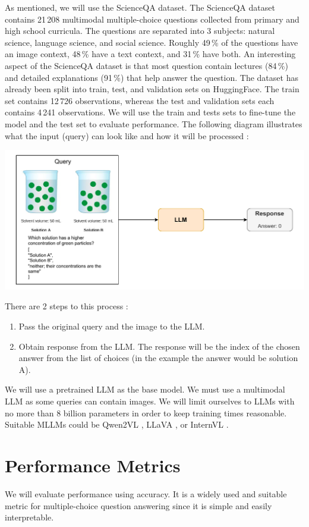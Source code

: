 \documentclass[11pt]{article} %
\begin{document}
As mentioned, we will use the ScienceQA dataset. The ScienceQA dataset contains 21\,208 multimodal multiple-choice questions collected from primary and high school curricula. The questions are separated into 3 subjects: natural science, language science, and social science. Roughly 49\,\% of the questions have an image context, 48\,\% have a text context, and 31\,\% have both. An interesting aspect of the ScienceQA dataset is that most question contain lectures (84\,\%) and detailed explanations (91\,\%) that help answer the question. The dataset has already been split into train, test, and validation sets on HuggingFace. The train set contains 12\,726 observations, whereas the test and validation sets each contains 4\,241 observations. We will use the train and tests sets to fine-tune the model and the test set to evaluate performance. The following diagram illustrates what the input (query) can look like and how it will be processed : 

\includegraphics[width=\linewidth]{llm_diagram.pdf}

There are 2 steps to this process :
\begin{enumerate}
    \item Pass the original query and the image to the LLM.
    \item Obtain response from the LLM. The response will be the index of the chosen answer from the list of choices (in the example the answer would be solution A).
\end{enumerate}

We will use a pretrained LLM as the base model. We must use a multimodal LLM as some queries can contain images. We will limit ourselves to LLMs with no more than 8 billion parameters in order to keep training times reasonable. Suitable MLLMs could be Qwen2VL \cite{Qwen2VL}, LLaVA \cite{liu2023llava}, or InternVL \cite{chen2023internvl}. 

\section*{Performance Metrics}
We will evaluate performance using accuracy. It is a widely used and suitable metric for multiple-choice question answering since it is simple and easily interpretable.
\end{document}
